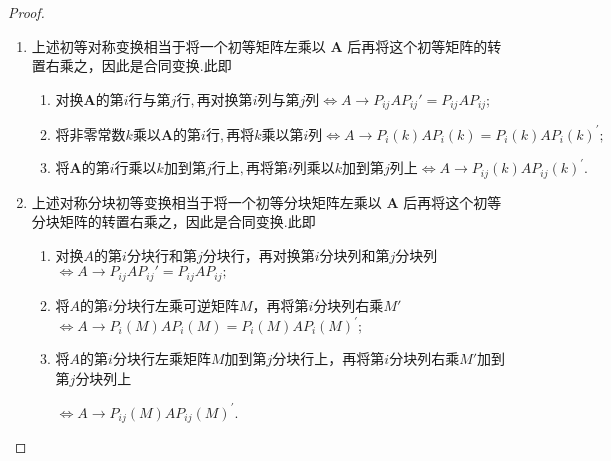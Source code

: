 \documentclass[../../main.tex]{subfiles}
\begin{document}
\begin{proof}
\begin{enumerate}
\item 上述初等对称变换相当于将一个初等矩阵左乘以 $\boldsymbol{A}$ 后再将这个初等矩阵的转置右乘之，因此是合同变换.此即
\begin{enumerate}[(1)]
\item $\text{对换}\boldsymbol{A}\text{的第}i\text{行与第}j\text{行},\text{再对换第}i\text{列与第}j\text{列} \iff A\rightarrow P_{ij}AP_{ij}'=P_{ij}AP_{ij};$

\item $\text{将非零常数}k\text{乘以}\boldsymbol{A}\text{的第}i\text{行},\text{再将}k\text{乘以第}i\text{列}\Longleftrightarrow A\rightarrow P_i\left( k \right) AP_{i}\left( k \right)= P_i\left( k \right) AP_{i}\left( k \right)^{\prime};$

\item $\text{将}\boldsymbol{A}\text{的第}i\text{行乘以}k\text{加到第}j\text{行上},\text{再将第}i\text{列乘以}k\text{加到第}j\text{列上}\Longleftrightarrow A\rightarrow P_{ij}\left( k \right) AP_{ij}\left( k \right)^{\prime} .$
\end{enumerate}

\item 上述对称分块初等变换相当于将一个初等分块矩阵左乘以 $\boldsymbol{A}$ 后再将这个初等分块矩阵的转置右乘之，因此是合同变换.此即
\begin{enumerate}[(1)]
\item 对换\(A\)的第\(i\)分块行和第\(j\)分块行，再对换第\(i\)分块列和第\(j\)分块列$\iff A\rightarrow P_{ij}AP_{ij}'=P_{ij}AP_{ij};$

\item 将\(A\)的第\(i\)分块行左乘可逆矩阵\(M\)，再将第\(i\)分块列右乘\(M'\)$\Longleftrightarrow A\rightarrow P_i\left( M \right) AP_{i}\left( M \right)= P_i\left( M \right) AP_{i}\left( M \right)^{\prime};$

\item 将\(A\)的第\(i\)分块行左乘矩阵\(M\)加到第\(j\)分块行上，再将第\(i\)分块列右乘\(M'\)加到第\(j\)分块列上

$\Longleftrightarrow A\rightarrow P_{ij}\left( M \right) AP_{ij}\left( M \right)^{\prime} .$
\end{enumerate}
\end{enumerate}

\end{proof}
\end{document}
